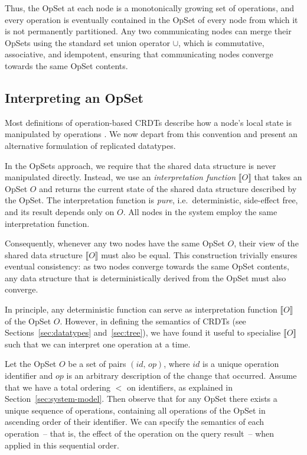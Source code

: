 Thus, the OpSet at each node is a monotonically growing set of operations, and every operation is eventually contained in the OpSet of every node from which it is not permanently partitioned.
Any two communicating nodes can merge their OpSets using the standard set union operator $\cup$, which is commutative, associative, and idempotent, ensuring that communicating nodes converge towards the same OpSet contents.

\subsection{Interpreting an OpSet}\label{sec:op-serial}

Most definitions of operation-based CRDTs describe how a node's local state is manipulated by operations \cite{Shapiro:2011wy,Shapiro:2011un}.
We now depart from this convention and present an alternative formulation of replicated datatypes.

In the OpSets approach, we require that the shared data structure is never manipulated directly.
Instead, we use an \emph{interpretation function} $\llbracket O \rrbracket$ that takes an OpSet $O$ and returns the current state of the shared data structure described by the OpSet.
The interpretation function is \emph{pure}, i.e.\ deterministic, side-effect free, and its result depends only on $O$.
All nodes in the system employ the same interpretation function.

Consequently, whenever any two nodes have the same OpSet $O$, their view of the shared data structure $\llbracket O \rrbracket$ must also be equal.
This construction trivially ensures eventual consistency: as two nodes converge towards the same OpSet contents, any data structure that is deterministically derived from the OpSet must also converge.

In principle, any deterministic function can serve as interpretation function $\llbracket O \rrbracket$ of the OpSet $O$.
However, in defining the semantics of CRDTs (see Sections~\ref{sec:datatypes} and~\ref{sec:tree}), we have found it useful to specialise $\llbracket O \rrbracket$ such that we can interpret one operation at a time.

Let the OpSet $O$ be a set of pairs $(\mathit{id},\, \mathit{op})$, where $\mathit{id}$ is a unique operation identifier and $\mathit{op}$ is an arbitrary description of the change that occurred.
Assume that we have a total ordering $<$ on identifiers, as explained in Section~\ref{sec:system-model}.
Then observe that for any OpSet there exists a unique sequence of operations, containing all operations of the OpSet in ascending order of their identifier.
We can specify the semantics of each operation~-- that is, the effect of the operation on the query result~-- when applied in this sequential order.


